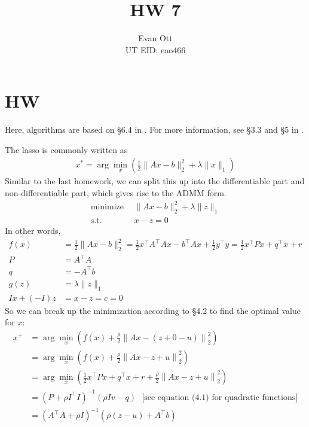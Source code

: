 \documentclass{article}
\title{\vspace{-6ex}HW 7\vspace{-2ex}}
\author{Evan Ott \\ UT EID: eao466\vspace{-2ex}}
\begin{document}
\maketitle

\section{HW}




Here, algorithms are based on \S6.4 in \citep{boyd2011distributed}. For more information, see \S3.3 and \S5 in \citep{boyd2004convex}.



The lasso is commonly written as
\begin{align*}
x^*=\arg\min_x\left(\frac{1}{2}\lVert Ax-b\rVert_2^2 + \lambda \lVert x\rVert_1\right)
\end{align*}
Similar to the last homework, we can split this up into the differentiable part and non-differentiable part, which
gives rise to the ADMM form.
\begin{align*}
\textrm{minimize}~~ &\lVert Ax-b\rVert_2^2 + \lambda \lVert z\rVert_1\\
\textrm{s.t.}~~&x-z=0
\end{align*}
In other words, 
\begin{align*}
f(x)&=\frac{1}{2}\lVert Ax-b\rVert_2^2 = \frac{1}{2}x^\top A^\top A x - b^\top Ax+\frac{1}{2}y^\top y=\frac{1}{2}x^\top Px+q^\top x+r\\
P&=A^\top A\\
q&=-A^\top b\\
g(z)&=\lambda \lVert z\rVert_1\\
Ix + (-I)z &= x-z = c = 0
\end{align*}
So we can break up the minimization according to \S4.2 to find the optimal value for $x$:
\begin{align*}
x^+&=\arg\min_x \left( f(x) + \frac{\rho}{2}\left\lVert Ax-(z+0-u) \right\rVert_2^2 \right)\\
&=\arg\min_x \left( f(x) + \frac{\rho}{2}\left\lVert Ax - z + u \right\rVert_2^2 \right)\\
&=\arg\min_x \left( \frac{1}{2}x^\top Px+q^\top x+r + \frac{\rho}{2}\left\lVert Ax - z + u \right\rVert_2^2 \right)\\
&=\left(P + \rho I^\top I\right)^{-1}\left(\rho I v-q\right)~~~\textrm{[see equation (4.1) for quadratic functions]}\\
&=\left( A^\top A+ \rho I\right)^{-1}\left(\rho  (z - u)+A^\top b\right)
\end{align*}
\end{document}
